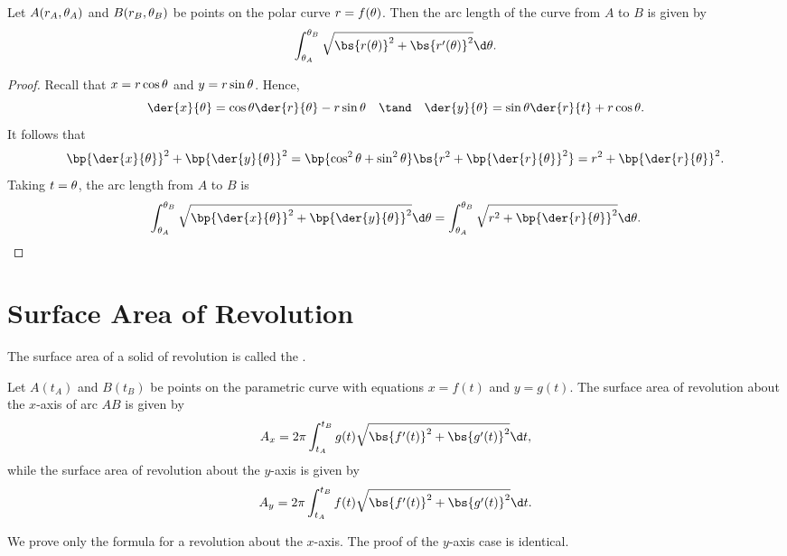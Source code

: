 \begin{proposition}
    Let $A(r_A, \theta_A)$ and $B(r_B, \theta_B)$ be points on the polar curve $r = f(\theta)$. Then the arc length of the curve from $A$ to $B$ is given by \[\int_{\t_A}^{\t_B} \sqrt{\bs{r(\t)}^2 + \bs{r'(\t)}^2} \d \t.\]
\end{proposition}
\begin{proof}
    Recall that $x = r\cos \theta$ and $y = r\sin \theta$. Hence, \[\der{x}{\t} = \cos \t \der{r}{\t} - r \sin \t \quad \tand \quad \der{y}{\t} = \sin \t \der{r}{t} + r \cos \t.\] It follows that \[\bp{\der{x}{\t}}^2 + \bp{\der{y}{\t}}^2 = \bp{\cos^2 \t + \sin^2 \t} \bs{r^2 + \bp{\der{r}{\t}}^2} = r^2 + \bp{\der{r}{\t}}^2.\] Taking $t = \theta$, the arc length from $A$ to $B$ is \[\int_{\t_A}^{\t_B} \sqrt{\bp{\der{x}{\t}}^2 + \bp{\der{y}{\t}}^2} \d \t = \int_{\t_A}^{\t_B} \sqrt{r^2 + \bp{\der{r}{\t}}^2} \d \t.\]
\end{proof}

\section{Surface Area of Revolution}

\begin{definition}
    The surface area of a solid of revolution is called the .
\end{definition}

\begin{proposition}
    Let $A(t_A)$ and $B(t_B)$ be points on the parametric curve with equations $x = f(t)$ and $y = g(t)$. The surface area of revolution about the $x$-axis of arc $AB$ is given by \[A_x = 2\pi \int_{t_A}^{t_B} g(t) \sqrt{\bs{f'(t)}^2 + \bs{g'(t)}^2} \d t,\] while the surface area of revolution about the $y$-axis is given by \[A_y = 2\pi \int_{t_A}^{t_B} f(t) \sqrt{\bs{f'(t)}^2 + \bs{g'(t)}^2} \d t.\]
\end{proposition}
We prove only the formula for a revolution about the $x$-axis. The proof of the $y$-axis case is identical.

